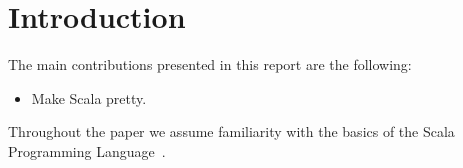 
\section{Introduction} %
\label{sec:Introduction}
The main contributions presented in this report are the following:
\begin{itemize}
    \item Make Scala pretty.
\end{itemize}
Throughout the paper we assume familiarity with the basics of the Scala
Programming Language~\autocite{odersky_scala_2004}.
